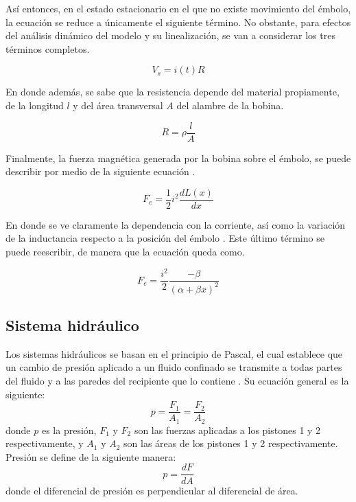 \documentclass[journal]{IEEEtran}
\begin{document}
\setlength{\parskip}{1em}

Así entonces, en el estado estacionario en el que no existe movimiento del émbolo, la ecuación se reduce
a únicamente el siguiente término. No obstante, para efectos del análisis dinámico del modelo y su linealización, 
se van a considerar los tres términos completos.

\begin{equation}
    V_s = i(t)R
\end{equation}

En donde además, se sabe que la resistencia depende del material propiamente, de la longitud $l$ y del 
área transversal $A$ del alambre de la bobina. 

\begin{equation}
    R = \rho \frac{l}{A}
\label{eq:resistencia_solenoide}
\end{equation}

Finalmente, la fuerza magnética generada por la bobina sobre el émbolo, se puede describir por medio
de la siguiente ecuación \cite{sadiku2001electromagnetics}.

\begin{equation}
    F_e = \frac{1}{2} i^2 \frac{dL(x)}{dx}
\label{eq:fuerza_magnetica_solenoide}
\end{equation}

En donde se ve claramente la dependencia con la corriente, así como la variación
de la inductancia respecto a la posición del émbolo \cite{mathworks_solenoid}. Este último término se puede reescribir,
de manera que la ecuación queda como.

\begin{equation}
    F_e = \frac{i^2}{2} \frac{-\beta}{(\alpha + \beta x)^2}
\label{eq:fuerza_magnetica_solenoide_reescrita}
\end{equation}


\subsection{Sistema hidráulico}
Los sistemas hidráulicos se basan en el principio de Pascal, el cual establece que un cambio de presión aplicado a un
fluido confinado se transmite a todas partes del fluido y a las paredes del recipiente que lo contiene \cite{PhysicsBook}. Su ecuación general es la siguiente:
\begin{equation}
    p = \frac{F_1}{A_1} = \frac{F_2}{A_2}
\end{equation}
donde $p$ es la presión, $F_1$ y $F_2$ son las fuerzas aplicadas a los pistones 1 y 2 respectivamente, y $A_1$ y $A_2$ son las áreas de los pistones 1 y 2 respectivamente. Presión se define de la siguiente manera:
\begin{equation}
    p = \frac{dF}{dA}
\end{equation}
donde el diferencial de presión es perpendicular al diferencial de área.
\end{document}
